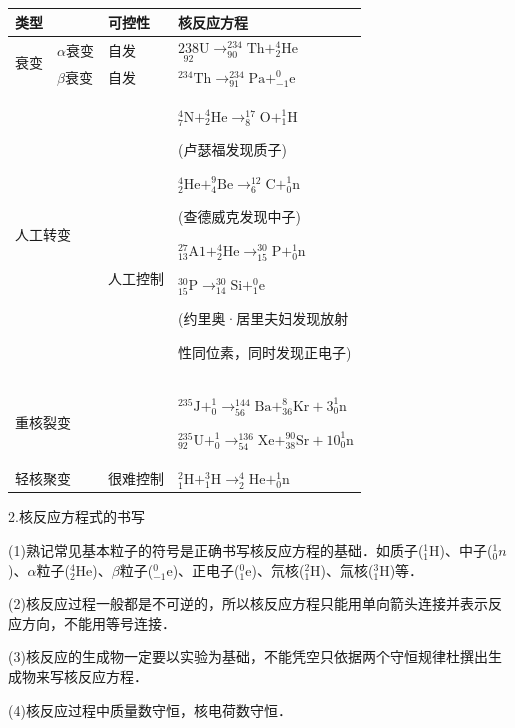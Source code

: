 \begin{longtable}[]{@{}m{1cm}m{1cm}m{2cm}m{5cm}@{}}
\toprule
\multicolumn{2}{l}{类型}& 可控性 & 核反应方程 \tabularnewline
\midrule
\endhead
\multirow{2}{2cm}{衰变}
&
$\alpha$衰变
&
自发
&
$\underset{92}{238} \mathrm{U} \longrightarrow_{90}^{234} \mathrm{Th}+_{2}^{4} \mathrm{He}$
\tabularnewline
& $\beta$衰变 & 自发 & $^{234} \mathrm{Th} \rightarrow_{91}^{234} \mathrm{Pa}+_{-1}^{0} \mathrm{e}$\tabularnewline
\multicolumn{2}{l}{人工转变}
&
\multirow{2}{2cm}{人工控制}    
&
$_{7}^{4} \mathrm{N}+_{2}^{4} \mathrm{He} \longrightarrow_{8}^{17} \mathrm{O}+_{1}^{1} \mathrm{H}$

(卢瑟福发现质子)

$_{2}^{4} \mathrm{He}+_{4}^{9} \mathrm{Be} \longrightarrow_{6}^{12} \mathrm{C}+_{0}^{1} \mathrm{n}$

(查德威克发现中子)

$_{13}^{27} \mathrm{A} 1+_{2}^{4} \mathrm{He} \longrightarrow_{15}^{30} \mathrm{P}+_{0}^{1} \mathrm{n}$

$_{15}^{30} \mathrm{P} \longrightarrow_{14}^{30} \mathrm{S} \mathrm{i}+_{1}^{0} \mathrm{e}$

(约里奥·居里夫妇发现放射

性同位素，同时发现正电子)
\tabularnewline
\multicolumn{2}{l}{重核裂变}
& &
$^{235} \mathrm{J}+_{0}^{1} \longrightarrow_{56}^{144} \mathrm{Ba}+_{36}^{8} \mathrm{Kr}+3_{0}^{1} \mathrm{n}$

$^{235} _{92} \mathrm{U}+_{0}^{1} \longrightarrow_{54}^{136} \mathrm{Xe}+_{38}^{90} \mathrm{Sr}+10_{0}^{1}\mathrm{n}$
\tabularnewline
\multicolumn{2}{l}{轻核聚变}
& 很难控制 & $_{1}^{2} \mathrm{H}+_{1}^{3} \mathrm{H} \longrightarrow_{2}^{4} \mathrm{He}+_{0}^{1} \mathrm{n}$\tabularnewline
\bottomrule
\end{longtable}

2.核反应方程式的书写

(1)熟记常见基本粒子的符号是正确书写核反应方程的基础．如质子($_1^1 \mathrm{H}$)、中子($_{0}^{1} n$)、$\alpha$粒子($_{2 }^{4}\mathrm{He}$)、$\beta$粒子($^0_{-1} \mathrm{e}$)、正电子($^0_1 \mathrm{e}$)、氘核($^{2} _1 \mathrm{H}$)、氚核($_{1}^{3} \mathrm{H}$)等．

(2)核反应过程一般都是不可逆的，所以核反应方程只能用单向箭头连接并表示反应方向，不能用等号连接．

(3)核反应的生成物一定要以实验为基础，不能凭空只依据两个守恒规律杜撰出生成物来写核反应方程．

(4)核反应过程中质量数守恒，核电荷数守恒．

